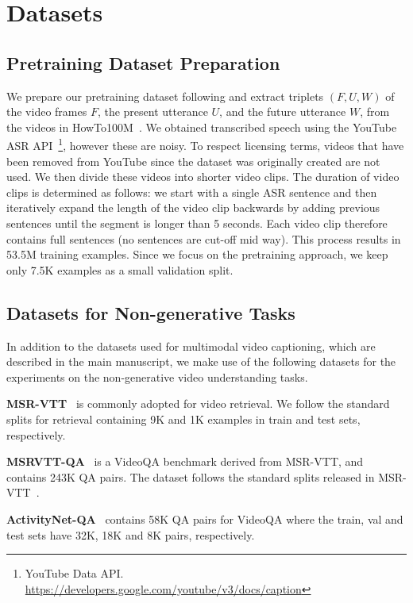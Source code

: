 \documentclass[10pt,twocolumn,letterpaper]{article}
\begin{document}
\section{Datasets}
\label{sec:supp-dataset}
\subsection{Pretraining Dataset Preparation} 
We prepare our pretraining dataset following \cite{seo2021look} and extract triplets $(F, U, W)$ of the video frames $F$, the present utterance $U$, and the future utterance $W$, from the videos in HowTo100M~\cite{miech2019howto100m}.
We obtained transcribed speech using the YouTube ASR API~\footnote{YouTube  Data  API. \url{https://developers.google.com/youtube/v3/docs/caption}}, however these are noisy. 
To respect licensing terms, videos that have been removed from YouTube since the dataset was originally created are not used.
We then divide these videos into shorter video clips. 
The duration of video clips is determined as follows: we start with a single ASR sentence and then iteratively expand the length of the video clip backwards by adding previous sentences until the segment is longer than 5 seconds.
Each video clip therefore contains full sentences (no sentences are cut-off mid way). 
This process results in 53.5M training examples.
Since we focus on the pretraining approach, we keep only 7.5K examples as a small validation split.

\subsection{Datasets for Non-generative Tasks}
In addition to the datasets used for multimodal video captioning, which are described in the main manuscript, we make use of the following datasets for the experiments on the non-generative video understanding tasks.

\noindent\textbf{MSR-VTT}~\cite{xu2016msr} is commonly adopted for video retrieval. We follow the standard splits for retrieval \cite{yu2018joint} containing 9K and 1K examples in train and test sets, respectively.

\noindent\textbf{MSRVTT-QA}~\cite{xu2017video} is a VideoQA benchmark derived from MSR-VTT, and contains 243K QA pairs. The dataset follows the standard splits released in MSR-VTT~\cite{xu2016msr}.

\noindent\textbf{ActivityNet-QA}~\cite{yu2019activitynet} contains 58K QA pairs for VideoQA where the train, val and test sets have 32K, 18K and 8K pairs, respectively. 
\end{document}
